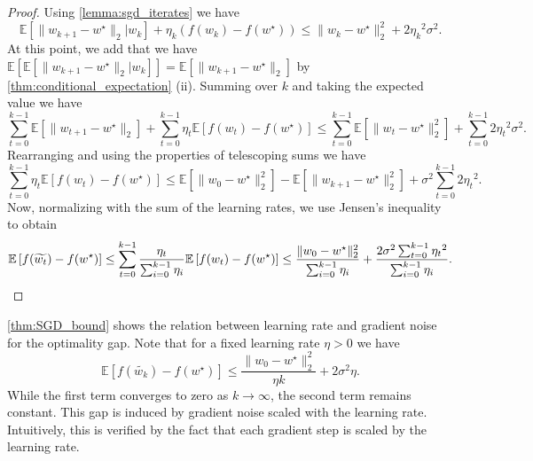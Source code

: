 \documentclass[12pt]{article}
\theoremstyle{definition}
\numberwithin{equation}{section}
\newcommand{\E}{\mathbb{E}}
\newcommand{\ev}[1]{\mathbb{E}\left[{#1}\right]}
\newcommand{\norm}[1]{\lVert{#1}\rVert_2}
\begin{document}
\begin{proof}
  Using \autoref{lemma:sgd_iterates} we have
  \begin{equation*}
    \E[\norm{w_{k+1} - w^\star}|w_k] + \eta_k (f(w_{k}) - f(w^\star)) \leq \norm{w_{k} - w^\star}^2 + 2{\eta_k}^2\sigma^2.
  \end{equation*}
  At this point, we add that we have $\ev{\E[\norm{w_{k+1} - w^\star}|w_k]} = \ev{\norm{w_{k+1} - w^\star}}$ by \autoref{thm:conditional_expectation} (ii).
  Summing over $k$ and taking the expected value we have
  \begin{equation*}
    \sum_{t=0}^{k-1}\ev{\norm{w_{t+1} - w^\star}} + \sum_{t=0}^{k-1} \eta_t \ev{f(w_{t}) - f(w^\star)} \leq \sum_{t=0}^{k-1} \ev{\norm{w_{t} - w^\star}^2} + \sum_{t=0}^{k-1} 2{\eta_t}^2\sigma^2.
  \end{equation*}
  Rearranging and using the properties of telescoping sums we have
  \begin{equation*}
    \sum_{t=0}^{k-1} \eta_t \ev{f(w_{t}) - f(w^\star)} \leq \ev{\norm{w_{0} - w^\star}^2} - \ev{\norm{w_{k+1} - w^\star}^2} + \sigma^2\sum_{t=0}^{k-1} 2{\eta_t}^2.
  \end{equation*}
  Now, normalizing with the sum of the learning rates, we use Jensen's inequality to obtain
  \begin{equation*}
    \ev{f(\widetilde{w_{t}}) - f(w^\star)} \leq \sum_{t=0}^{k-1} \frac{\eta_t}{\sum_{i=0}^{k-1}\eta_i} \ev{f(w_{t}) - f(w^\star)} \leq \frac{\norm{w_{0} - w^\star}^2}{\sum_{i=0}^{k-1}\eta_i} + \frac{2\sigma^2\sum_{t=0}^{k-1} {\eta_t}^2}{\sum_{i=0}^{k-1}\eta_i}. \qedhere
  \end{equation*}
\end{proof}

\autoref{thm:SGD_bound} shows the relation between learning rate and gradient noise for the optimality gap. Note that for a fixed learning rate $\eta > 0$ we have
\begin{equation*}
  \E [f(\widetilde{w_{k}}) - f(w^\star)] \leq \frac{\norm{w_{0} - w^\star}^2}{\eta k} + 2 \sigma^2 \eta.
\end{equation*}
While the first term converges to zero as $k \rightarrow \infty$, the second term remains constant. This gap is induced by gradient noise scaled with the learning rate. Intuitively, this is verified by the fact that each gradient step is scaled by the learning rate.
\end{document}
